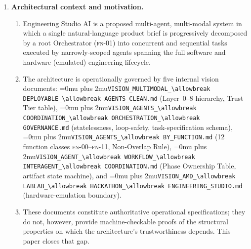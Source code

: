\documentclass[12pt]{article}
\theoremstyle{definition}
\DeclareRobustCommand{\code}[1]{\begingroup\Urlmuskip=0mu plus 2mu\relax\nolinkurl{#1}\endgroup}
\newcommand{\FN}[1]{\textsc{fn-#1}}
\newcommand{\VisionClean}{\code{VISION\_MULTIMODAL\_\allowbreak DEPLOYABLE\_\allowbreak AGENTS\_CLEAN.md}}
\newcommand{\VisionGov}{\code{VISION\_AGENTS\_\allowbreak COORDINATION\_\allowbreak ORCHESTRATION\_\allowbreak GOVERNANCE.md}}
\newcommand{\VisionFunc}{\code{VISION\_AGENTS\_\allowbreak BY\_FUNCTION.md}}
\newcommand{\VisionFlow}{\code{VISION\_AGENT\_\allowbreak WORKFLOW\_\allowbreak INTERAGENT\_\allowbreak COORDINATION.md}}
\newcommand{\VisionHackathon}{\code{VISION\_AMD\_\allowbreak LABLAB\_\allowbreak HACKATHON\_\allowbreak ENGINEERING\_STUDIO.md}}
\begin{document}
\begin{enumerate}

    \item \textbf{Architectural context and motivation.}
    \begin{enumerate}
        \item[(1.1)] Engineering Studio AI is a proposed multi-agent,
              multi-modal system in which a single natural-language
              product brief is progressively decomposed by a root
              Orchestrator (\FN{01}) into concurrent and sequential
              tasks executed by narrowly-scoped agents spanning the
              full software and hardware (emulated) engineering
              lifecycle.
        \item[(1.2)] The architecture is operationally governed by five
              internal vision documents: \VisionClean{} (Layer~0--8
              hierarchy, Trust Tier table), \VisionGov{} (statelessness,
              loop-safety, task-specification schema), \VisionFunc{}
              (12 function classes \FN{00}--\FN{11}, Non-Overlap Rule),
              \VisionFlow{} (Phase Ownership Table, artifact state
              machine), and \VisionHackathon{} (hardware-emulation
              boundary).
        \item[(1.3)] These documents constitute authoritative operational
              specifications; they do not, however, provide
              machine-checkable proofs of the structural properties on
              which the architecture's trustworthiness depends.
              This paper closes that gap.
    \end{enumerate}


\end{enumerate}
\end{document}
